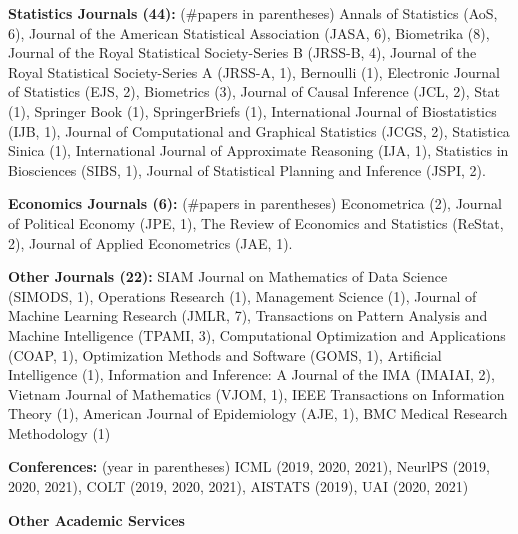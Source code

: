 \documentclass{article}
\begin{document}
\vspace{2mm}
\noindent \textbf{Statistics Journals (44): }(\#papers in parentheses) Annals of Statistics (AoS, 6), Journal of the American Statistical Association (JASA, 6), Biometrika (8), Journal of the Royal Statistical Society-Series B (JRSS-B, 4), Journal of the Royal Statistical Society-Series A (JRSS-A, 1), Bernoulli (1), Electronic Journal of Statistics (EJS, 2), Biometrics (3), Journal of Causal Inference (JCL, 2), Stat (1), Springer Book (1), SpringerBriefs (1), International Journal of Biostatistics (IJB, 1), Journal of Computational and Graphical Statistics (JCGS, 2), Statistica Sinica (1), International Journal of Approximate Reasoning (IJA, 1), Statistics in Biosciences (SIBS, 1), Journal of Statistical Planning and Inference (JSPI, 2).

\vspace{2mm}
\noindent \textbf{Economics Journals (6): }(\#papers in parentheses) Econometrica (2), Journal of Political Economy (JPE, 1), The Review of Economics and Statistics (ReStat, 2), Journal of Applied Econometrics (JAE, 1).

\vspace{2mm}
\noindent \textbf{Other Journals (22): } SIAM Journal on Mathematics of Data Science (SIMODS, 1), Operations Research (1), Management Science (1), Journal of Machine Learning Research (JMLR, 7), Transactions on Pattern Analysis and Machine Intelligence (TPAMI, 3), Computational Optimization and Applications (COAP, 1), Optimization Methods and Software (GOMS, 1), Artificial Intelligence (1), Information and Inference: A Journal of the IMA (IMAIAI, 2), Vietnam Journal of Mathematics (VJOM, 1), IEEE Transactions on Information Theory (1), American Journal of Epidemiology (AJE, 1), BMC Medical Research Methodology (1)

\vspace{2mm}
\noindent \textbf{Conferences: }(year in parentheses) ICML (2019, 2020, 2021), NeurlPS (2019, 2020, 2021), COLT (2019, 2020, 2021), AISTATS (2019), UAI (2020, 2021)

\vspace{7mm}
\begin{large}
\noindent \textbf{Other Academic Services}
\end{large}
\end{document}
